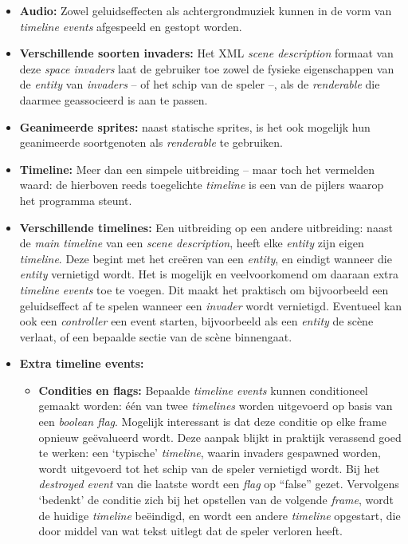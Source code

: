\documentclass[10pt,a4paper]{article}
\begin{document}
\begin{itemize}

\item \textbf{Audio:} Zowel geluidseffecten als achtergrondmuziek kunnen 
in de vorm van \emph{timeline events} afgespeeld en gestopt worden.

\item \textbf{Verschillende soorten invaders:} Het XML 
\emph{scene description} formaat van deze \emph{space invaders} laat
de gebruiker toe zowel de fysieke eigenschappen van de 
\emph{entity} van \emph{invaders} -- of het schip van de speler --, 
als de \emph{renderable} die daarmee geassocieerd is
aan te passen.

\item \textbf{Geanimeerde sprites:} naast statische sprites, is het
ook mogelijk hun geanimeerde soortgenoten als \emph{renderable} te 
gebruiken.

\item \textbf{Timeline:} Meer dan een simpele uitbreiding -- 
maar toch het vermelden waard: de hierboven
reeds toegelichte \emph{timeline} is een van de pijlers waarop het programma
steunt.

\item \textbf{Verschillende timelines:} Een uitbreiding op een 
andere uitbreiding: naast de \emph{main timeline} van een 
\emph{scene description}, heeft elke \emph{entity} zijn eigen 
\emph{timeline}. Deze begint met het cre\"eren van een \emph{entity}, 
en eindigt wanneer die \emph{entity} vernietigd wordt. Het is mogelijk
en veelvoorkomend om daaraan extra \emph{timeline events} toe te voegen.
Dit maakt het praktisch om bijvoorbeeld een geluidseffect af te spelen
wanneer een \emph{invader} wordt vernietigd. Eventueel kan ook een 
\emph{controller} een event starten, bijvoorbeeld als een \emph{entity}
de sc\`ene verlaat, of een bepaalde sectie van de sc\`ene binnengaat.

\item \textbf{Extra timeline events:}
\begin{itemize}
	
\item \textbf{Condities en flags:} Bepaalde \emph{timeline events} kunnen
conditioneel gemaakt worden: \'e\'en van twee \emph{timelines} worden 
uitgevoerd op basis van een \emph{boolean flag}. 
Mogelijk interessant is dat deze conditie op elke frame 
opnieuw ge\"evalueerd wordt. Deze aanpak blijkt in praktijk 
verassend goed te werken: een `typische' \emph{timeline}, waarin
invaders gespawned worden, wordt uitgevoerd tot het schip van de speler
vernietigd wordt. Bij het \emph{destroyed event} van die laatste 
wordt een \emph{flag} op ``false'' gezet. Vervolgens `bedenkt' de conditie 
zich bij het opstellen van
de volgende \emph{frame}, wordt de huidige 
\emph{timeline} be\"eindigd, en wordt een andere \emph{timeline} opgestart,
die door middel van wat tekst uitlegt dat de speler verloren heeft.


\end{itemize}
\end{itemize}
\end{document}
